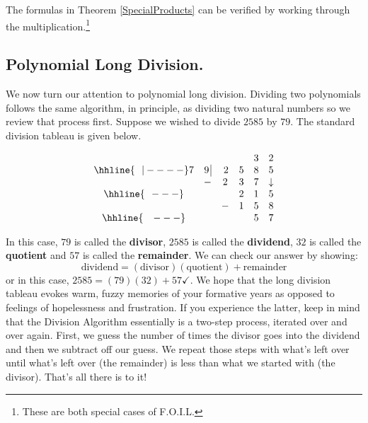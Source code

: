 \documentclass{ximera}
\begin{document}
\medskip

The formulas in Theorem \ref{SpecialProducts} can be verified by working through the multiplication.\footnote{These are both special cases of F.O.I.L.}

\subsection{Polynomial Long Division.}
\label{polylongdiv}

We now turn our attention to polynomial long division.  Dividing two polynomials follows the same algorithm, in principle, as dividing two natural numbers so we review that process first.  Suppose we wished to divide $2585$ by $79$.  The standard division tableau is given below. 

\setlength\arraycolsep{0.1pt}
\setlength\extrarowheight{2pt}

\[ \begin{array}{cccccc}

    &             &      &    & 3   & 2  \\ \hhline{~~|----}

  7 & 9 \, \vline & \, 2 & 5 & 8 & 5  \\

    &            -&    2 & 3 & 7 & \downarrow \\ \hhline{~~---} 
    &             &      & 2 & 1 &  5   \\ 
    &             &     - & 1 & 5 & 8    \\ \hhline{~~~---} 
    &             &      &   & 5 & 7    \\

 
\end{array}\]

\setlength\arraycolsep{5pt}
\setlength\extrarowheight{0pt}

In this case, $79$ is called the \textbf{divisor}, $2585$ is called the \textbf{dividend}, $32$ is called the \textbf{quotient} and $57$ is called the \textbf{remainder}.  We can check our answer by showing:  \[ \text{dividend} = (\text{divisor})( \text{quotient}) + \text{remainder}\] or in this case, $2585 = 
 (79)(32) + 57 \checkmark$.  We hope that the long division tableau evokes warm, fuzzy memories of your formative years as opposed to feelings of hopelessness and frustration.  If you experience the latter, keep in mind that the Division Algorithm essentially is a two-step process, iterated over and over again.  First, we guess the number of times the divisor goes into the dividend and  then we subtract off our guess.  We repeat those steps with what's left over until what's left over (the remainder) is less than what we started with (the divisor).  That's all there is to it!
\end{document}
